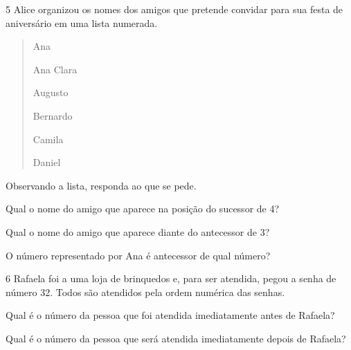 \vspace{-2ex}

\num{5} Alice organizou os nomes dos amigos que pretende convidar para sua
festa de aniversário em uma lista numerada.

\begin{quote}
\begin{enumerate}
\begin{multicols}{2}
\item Ana

\item Ana Clara

\item Augusto

\item Bernardo

\item Camila

\item Daniel
\end{multicols}
\end{enumerate}
\end{quote}

Observando a lista, responda ao que se pede.

\begin{escolha}
\item Qual o nome do amigo que aparece na posição do sucessor de 4?

\item Qual o nome do amigo que aparece diante do antecessor de 3?

\item O número representado por Ana é antecessor de qual número?
\end{escolha}

\num{6} Rafaela foi a uma loja de brinquedos e, para ser atendida, pegou a senha de
número 32. Todos são atendidos pela ordem numérica das senhas.



\begin{escolha}
\item Qual é o número da pessoa que foi atendida imediatamente antes de Rafaela?

\item Qual é o número da pessoa que será  atendida imediatamente depois de Rafaela?
\end{escolha}


